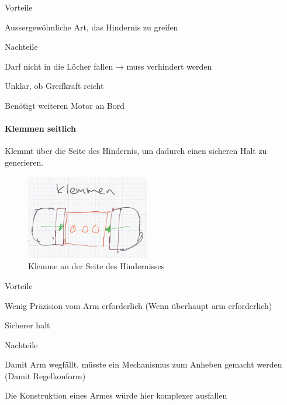 \documentclass[../main.tex]{subfiles}
\begin{document}
\begin{minipage}[t]{0.48\textwidth}
    \begin{items}
          \item [Vorteile]
          \item Aussergewöhnliche Art, das Hindernis zu greifen
    \end{items}
\end{minipage}
\hfill
\begin{minipage}[t]{0.48\textwidth}
    \begin{items}
          \item [Nachteile]
          \item Darf nicht in die Löcher fallen → muss verhindert werden
          \item Unklar, ob Greifkraft reicht
          \item Benötigt weiteren Motor an Bord
    \end{items}
\end{minipage}
\newpage
\paragraph{Klemmen seitlich}
Klemmt über die Seite des Hindernis, um dadurch einen sicheren Halt zu generieren.

\begin{figure}[h!]
        \centering
        \includegraphics[width=0.48\textwidth]{img/technologierecherche/Aufnahme/Laengsweg_Griff.jpg}
        \caption{Klemme an der Seite des Hindernisses}
        \label{img:tech_Laengsweg_Griff}
\end{figure}

\begin{minipage}[t]{0.48\textwidth}
    \begin{items}
          \item [Vorteile]
          \item Wenig Präzision vom Arm erforderlich (Wenn überhaupt arm erforderlich)
          \item Sicherer halt
    \end{items}
\end{minipage}
\hfill
\begin{minipage}[t]{0.48\textwidth}
    \begin{items}
          \item [Nachteile]
          \item Damit Arm wegfällt, müsste ein Mechanismus zum Anheben gemacht werden (Damit Regelkonform)
          \item Die Konstruktion eines Armes würde hier komplexer ausfallen 
    \end{items}
\end{minipage}
\newpage
\end{document}
